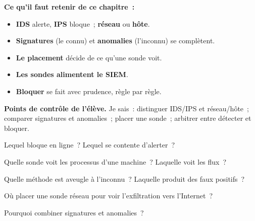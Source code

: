 \separateur

\begin{boxresume}
\textbf{Ce qu'il faut retenir de ce chapitre~:}
\begin{itemize}
    \item \textbf{IDS} alerte, \textbf{IPS} bloque~; \textbf{réseau} ou
          \textbf{hôte}.
    \item \textbf{Signatures} (le connu) et \textbf{anomalies} (l'inconnu)
          se complètent.
    \item \textbf{Le placement} décide de ce qu'une sonde voit.
    \item \textbf{Les sondes alimentent le SIEM}.
    \item \textbf{Bloquer} se fait avec prudence, règle par règle.
\end{itemize}
\end{boxresume}

\begin{boxinfo}
\textbf{Points de contrôle de l'élève.} Je sais~: distinguer IDS/IPS et
réseau/hôte~; comparer signatures et anomalies~; placer une sonde~; arbitrer
entre détecter et bloquer.
\end{boxinfo}

\bigskip

\begin{boxexo}[title={\ding{45}\quad Exercice~6.1. IDS ou IPS \niveaubase}]
Lequel bloque en ligne~? Lequel se contente d'alerter~?
\end{boxexo}

\begin{boxexo}[title={\ding{45}\quad Exercice~6.2. Réseau ou hôte \niveaubase}]
Quelle sonde voit les processus d'une machine~? Laquelle voit les flux~?
\end{boxexo}

\begin{boxexo}[title={\ding{45}\quad Exercice~6.3. Méthodes \niveaubase}]
Quelle méthode est aveugle à l'inconnu~? Laquelle produit des faux positifs~?
\end{boxexo}

\begin{boxexo}[title={\ding{45}\quad Exercice~6.4. Placement \niveaumoyen}]
Où placer une sonde réseau pour voir l'exfiltration vers l'Internet~?
\end{boxexo}

\begin{boxexo}[title={\ding{45}\quad Exercice~6.5. Complémentarité \niveaumoyen}]
Pourquoi combiner signatures et anomalies~?
\end{boxexo}

